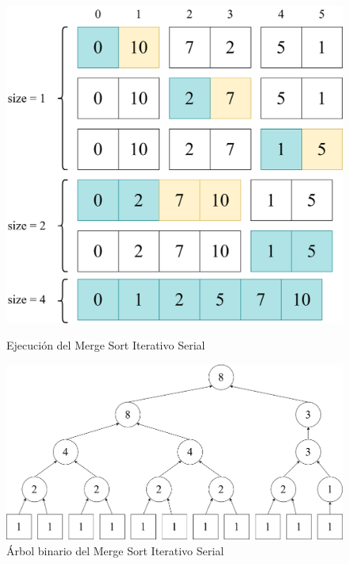 \documentclass[titlepage]{article}
\begin{document}
\begin{figure}[h]
	\centering 
	\captionsetup{justification=centering, margin=10pt}
	\begin{minipage}{0.4\textwidth} 
		\centering
		\includegraphics[width=1\linewidth]{Diagrames/ejecucionMSIS.png}
		\caption{Ejecución del Merge Sort Iterativo Serial}
		\label{fig:ejecuciónMSIS}
	\end{minipage}\hfill \hspace{3pt}
	\begin{minipage}{0.55\textwidth} 
		\centering
		\includegraphics[width=1\linewidth]{Diagrames/arbolMSISirregular.png}
		\caption{Árbol binario del Merge Sort Iterativo Serial}
		\label{fig:arbolMSIS}
	\end{minipage} 
\end{figure}
\end{document}
